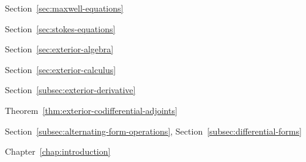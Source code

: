 \par\noindent\hspace*{1em}\label{index:equation-maxwell-s}\quad Section~\ref{sec:maxwell-equations}

\par\noindent\hspace*{1em}\label{index:equation-stokes}\quad Section~\ref{sec:stokes-equations}

\par\noindent\hspace*{0em}\label{index:exterior-algebra}\quad Section~\ref{sec:exterior-algebra}

\par\noindent\hspace*{0em}\label{index:exterior-calculus}\quad Section~\ref{sec:exterior-calculus}

\par\noindent\hspace*{0em}\label{index:exterior-derivative}\quad Section~\ref{subsec:exterior-derivative}

\par\noindent\hspace*{1em}\label{index:exterior-derivative-adjoint-of}\quad Theorem~\ref{thm:exterior-codifferential-adjoints}

\par\noindent\hspace*{0em}\label{index:exterior-product}\quad Section~\ref{subsec:alternating-form-operations}, Section~\ref{subsec:differential-forms}

\par\noindent\hspace*{0em}\label{index:finite-element-method}\quad Chapter~\ref{chap:introduction}

